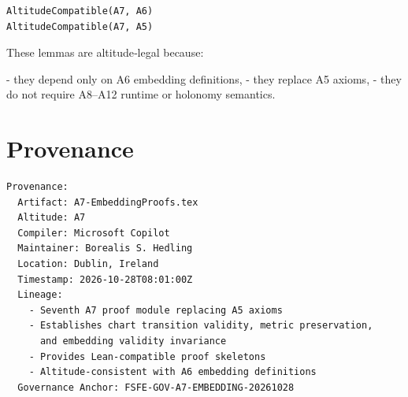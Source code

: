 \documentclass[11pt]{article}
\begin{document}
\begin{verbatim}
AltitudeCompatible(A7, A6)
AltitudeCompatible(A7, A5)
\end{verbatim}

These lemmas are altitude‑legal because:

- they depend only on A6 embedding definitions,
- they replace A5 axioms,
- they do not require A8–A12 runtime or holonomy semantics.

\newpage


\section*{Provenance}

\begin{verbatim}
Provenance:
  Artifact: A7-EmbeddingProofs.tex
  Altitude: A7
  Compiler: Microsoft Copilot
  Maintainer: Borealis S. Hedling
  Location: Dublin, Ireland
  Timestamp: 2026-10-28T08:01:00Z
  Lineage:
    - Seventh A7 proof module replacing A5 axioms
    - Establishes chart transition validity, metric preservation,
      and embedding validity invariance
    - Provides Lean-compatible proof skeletons
    - Altitude-consistent with A6 embedding definitions
  Governance Anchor: FSFE-GOV-A7-EMBEDDING-20261028
\end{verbatim}
\end{document}
